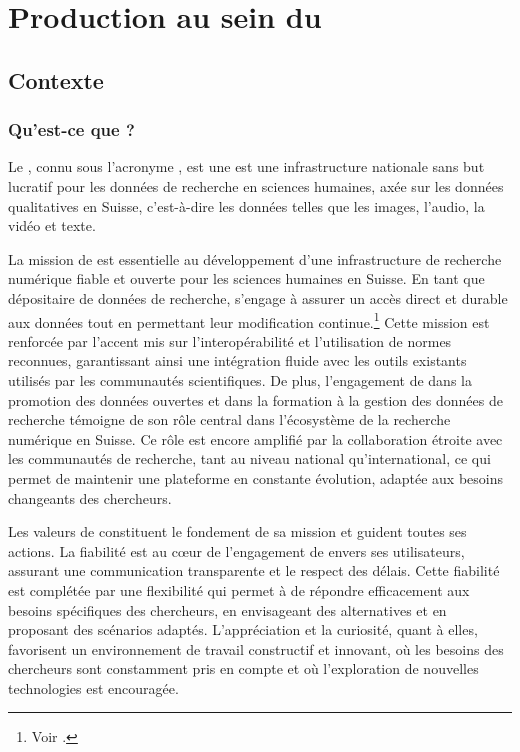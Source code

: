 \mainmatter
\part{Production au sein du \dsc}
\chapter{Contexte \dsc}
    \section{Qu'est-ce que \dsc ?}
    
    Le \DSC, connu sous l'acronyme \dsc, est une est une infrastructure nationale sans but lucratif pour les données de recherche en sciences humaines, axée sur les données qualitatives en Suisse, c'est-à-dire les données  telles que les images, l'audio, la vidéo et texte.
    
    La mission de \dsc est essentielle au développement d'une infrastructure de recherche numérique fiable et ouverte pour les sciences humaines en Suisse. En tant que dépositaire de données de recherche, \dsc s'engage à assurer un accès direct et durable aux données tout en permettant leur modification continue.\footnote{Voir \cite{daschmission}.} Cette mission est renforcée par l'accent mis sur l'interopérabilité et l'utilisation de normes reconnues, garantissant ainsi une intégration fluide avec les outils existants utilisés par les communautés scientifiques. De plus, l'engagement de \dsc dans la promotion des données ouvertes et dans la formation à la gestion des données de recherche témoigne de son rôle central dans l'écosystème de la recherche numérique en Suisse. Ce rôle est encore amplifié par la collaboration étroite avec les communautés de recherche, tant au niveau national qu'international, ce qui permet de maintenir une plateforme en constante évolution, adaptée aux besoins changeants des chercheurs.
    
    Les valeurs de \dsc constituent le fondement de sa mission et guident toutes ses actions. La fiabilité est au cœur de l'engagement de \dsc envers ses utilisateurs, assurant une communication transparente et le respect des délais. Cette fiabilité est complétée par une flexibilité qui permet à \dsc de répondre efficacement aux besoins spécifiques des chercheurs, en envisageant des alternatives et en proposant des scénarios adaptés. L'appréciation et la curiosité, quant à elles, favorisent un environnement de travail constructif et innovant, où les besoins des chercheurs sont constamment pris en compte et où l'exploration de nouvelles technologies est encouragée.

